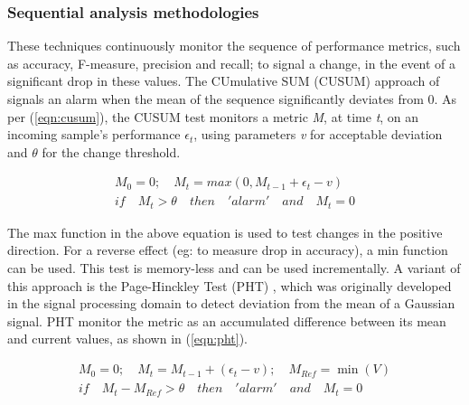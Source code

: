 \documentclass[authoryear,3p,times,twocolumn]{elsarticle}
\begin{document}
\subsubsection{Sequential analysis methodologies}
\label{sec:lr_seq}

These techniques continuously monitor the sequence of performance metrics, such as accuracy, F-measure, precision and recall; to signal a change, in the event of a significant drop in these values. The CUmulative SUM (CUSUM) approach of \citep{page1954continuous} signals an alarm when the mean of the sequence significantly deviates from 0. As per (\ref{eqn:cusum}), the CUSUM test monitors a metric\textit{ M}, at time\textit{ t}, on an incoming sample's performance $\epsilon_t$, using parameters \textit{v} for acceptable deviation and $\theta$ for the change threshold. 

\begin{equation} \label{eqn:cusum}
\begin{aligned}
M_{0}=0; \quad M_t=max{(0,M_{t-1}+\epsilon_t-v)}  
\\
if\quad { M }_{ t }>\theta \quad then \quad 'alarm' \quad and \quad { M }_{ t }=0
\end{aligned}
\end{equation}

The max function in the above equation is used to test changes in the positive direction. For a reverse effect (eg: to measure drop in accuracy), a min function can be used. This test is memory-less and can be used incrementally. A variant of this approach is the Page-Hinckley Test (PHT) \citep{page1954continuous}, which was originally developed in the signal processing domain to detect deviation from the mean of a Gaussian signal. PHT monitor the metric as an accumulated difference between its mean and current values, as shown in (\ref{eqn:pht}). 

\begin{equation} \label{eqn:pht}
\begin{aligned}
{ M }_{ 0 }=0;\quad { M }_{ t }={ M }_{ t-1 }+({ \epsilon  }_{ t }-v);\quad { M }_{ Ref }=\min { (V) } \\ if\quad { M }_{ t }-{ M }_{ Ref }>\theta \quad then\quad 'alarm'\quad and\quad { M }_{ t }=0
\end{aligned}
\end{equation}
\end{document}
